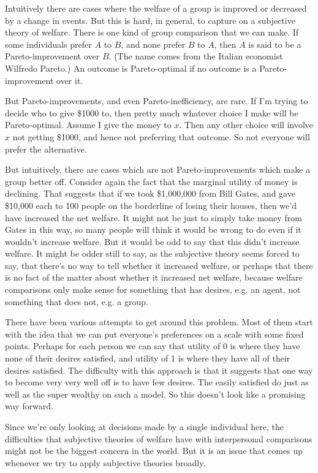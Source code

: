 Intuitively there are cases where the welfare of a group is improved or decreased by a change in events. But this is hard, in general, to capture on a subjective theory of welfare. There is one kind of group comparison that we can make. If some individuals prefer $A$ to $B$, and none prefer $B$ to $A$, then $A$ is said to be a Pareto-improvement over $B$. (The name comes from the Italian economist Wilfredo Pareto.) An outcome is Pareto-optimal if no outcome is a Pareto-improvement over it.

But Pareto-improvements, and even Pareto-inefficiency, are rare. If I'm trying to decide who to give \$1000 to, then pretty much whatever choice I make will be Pareto-optimal. Assume I give the money to $x$. Then any other choice will involve $x$ not getting \$1000, and hence not preferring that outcome. So not everyone will prefer the alternative.

But intuitively, there are cases which are not Pareto-improvements which make a group better off. Consider again the fact that the marginal utility of money is declining. That suggests that if we took \$1,000,000 from Bill Gates, and gave \$10,000 each to 100 people on the borderline of losing their houses, then we'd have increased the net welfare. It might not be just to simply take money from Gates in this way, so many people will think it would be wrong to do even if it wouldn't increase welfare. But it would be odd to say that this didn't increase welfare. It might be odder still to say, as the subjective theory seems forced to say, that there's no way to tell whether it increased welfare, or perhaps that there is no fact of the matter about whether it increased net welfare, because welfare comparisons only make sense for something that has desires, e.g. an agent, not something that does not, e.g. a group.

There have been various attempts to get around this problem. Most of them start with the idea that we can put everyone's preferences on a scale with some fixed points. Perhaps for each person we can say that utility of 0 is where they have none of their desires satisfied, and utility of 1 is where they have all of their desires satisfied. The difficulty with this approach is that it suggests that one way to become very very well off is to have few desires. The easily satisfied do just as well as the super wealthy on such a model. So this doesn't look like a promising way forward.

Since we're only looking at decisions made by a single individual here, the difficulties that subjective theories of welfare have with interpersonal comparisons might not be the biggest concern in the world. But it is an issue that comes up whenever we try to apply subjective theories broadly.

